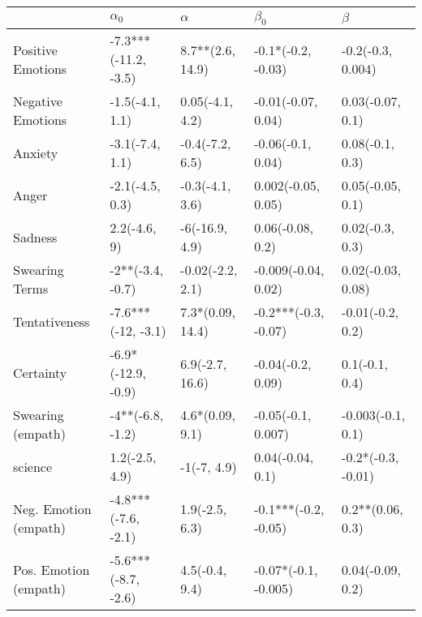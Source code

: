 \begin{tabular}{lllll}
\toprule
{} &            $\alpha_0$ &          $\alpha$ &             $\beta_0$ &             $\beta$ \\
\midrule
Positive Emotions     &  -7.3***(-11.2, -3.5) &  8.7**(2.6, 14.9) &    -0.1*(-0.2, -0.03) &   -0.2(-0.3, 0.004) \\
Negative Emotions     &       -1.5(-4.1, 1.1) &   0.05(-4.1, 4.2) &    -0.01(-0.07, 0.04) &    0.03(-0.07, 0.1) \\
Anxiety               &       -3.1(-7.4, 1.1) &   -0.4(-7.2, 6.5) &     -0.06(-0.1, 0.04) &     0.08(-0.1, 0.3) \\
Anger                 &       -2.1(-4.5, 0.3) &   -0.3(-4.1, 3.6) &    0.002(-0.05, 0.05) &    0.05(-0.05, 0.1) \\
Sadness               &          2.2(-4.6, 9) &    -6(-16.9, 4.9) &      0.06(-0.08, 0.2) &     0.02(-0.3, 0.3) \\
Swearing Terms        &      -2**(-3.4, -0.7) &  -0.02(-2.2, 2.1) &   -0.009(-0.04, 0.02) &   0.02(-0.03, 0.08) \\
Tentativeness         &    -7.6***(-12, -3.1) &  7.3*(0.09, 14.4) &  -0.2***(-0.3, -0.07) &    -0.01(-0.2, 0.2) \\
Certainty             &    -6.9*(-12.9, -0.9) &   6.9(-2.7, 16.6) &     -0.04(-0.2, 0.09) &      0.1(-0.1, 0.4) \\
Swearing (empath)     &      -4**(-6.8, -1.2) &   4.6*(0.09, 9.1) &    -0.05(-0.1, 0.007) &   -0.003(-0.1, 0.1) \\
science               &        1.2(-2.5, 4.9) &       -1(-7, 4.9) &      0.04(-0.04, 0.1) &  -0.2*(-0.3, -0.01) \\
Neg. Emotion (empath) &   -4.8***(-7.6, -2.1) &    1.9(-2.5, 6.3) &  -0.1***(-0.2, -0.05) &    0.2**(0.06, 0.3) \\
Pos. Emotion (empath) &   -5.6***(-8.7, -2.6) &    4.5(-0.4, 9.4) &  -0.07*(-0.1, -0.005) &    0.04(-0.09, 0.2) \\
\bottomrule
\end{tabular}
